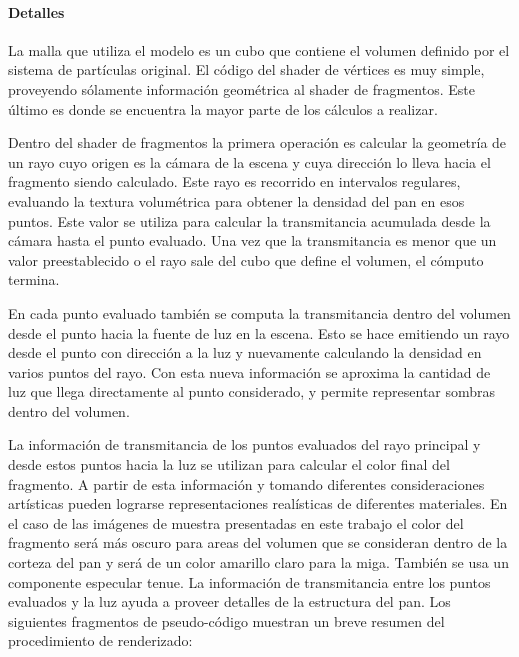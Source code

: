 \documentclass[oneside,a4paper,spanish,links]{amca}
\begin{document}
\paragraph{Detalles}

La malla que utiliza el modelo es un cubo que contiene el volumen
definido por el sistema de partículas original. El código del shader
de vértices es muy simple, proveyendo sólamente información geométrica
al shader de fragmentos. Este último es donde se encuentra la mayor
parte de los cálculos a realizar.

Dentro del shader de fragmentos la primera operaci\'on es calcular la
geometría de un rayo cuyo origen es la cámara de la escena y cuya
dirección lo lleva hacia el fragmento siendo calculado. Este rayo es
recorrido en intervalos regulares, evaluando la textura volumétrica
para obtener la densidad del pan en esos puntos. Este valor se utiliza
para calcular la transmitancia acumulada desde la cámara hasta el
punto evaluado. Una vez que la transmitancia es menor que un valor
preestablecido o el rayo sale del cubo que define el volumen, el
cómputo termina.

En cada punto evaluado también se computa la transmitancia dentro del
volumen desde el punto hacia la fuente de luz en la escena. Esto se
hace emitiendo un rayo desde el punto con dirección a la luz
y nuevamente calculando la densidad en varios puntos del rayo. Con esta
nueva información se aproxima la cantidad de luz que llega
directamente al punto considerado, y permite representar sombras dentro
del volumen.

La información de transmitancia de los puntos evaluados del rayo
principal y desde estos puntos hacia la luz se
utilizan para calcular el color final del fragmento. A partir de
esta información y tomando diferentes consideraciones artísticas
pueden lograrse representaciones realísticas de diferentes
materiales. En el caso de las imágenes de muestra presentadas en este
trabajo el color del fragmento será más oscuro para areas del volumen
que se consideran dentro de la corteza del pan y será de un color
amarillo claro para la miga. También se usa un componente especular
tenue. La información de transmitancia entre los puntos evaluados y la
luz ayuda a proveer detalles de la estructura del pan. Los siguientes fragmentos de pseudo-código muestran un breve resumen del procedimiento de renderizado:
\end{document}
